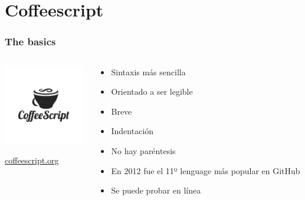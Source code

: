 %
%

\section{Coffeescript}

\begin{frame}
\frametitle{The basics}

\begin{columns}[T]
\begin{column}{.48\textwidth}
\begin{center}
\includegraphics[width=3.5cm]{figs/coffeescript}
\end{center}
\begin{flushright}
  {\Large
    \url{coffeescript.org}
  }
\end{flushright}

\end{column}%
\hfill%
\begin{column}{.50\textwidth}
{\Large
\begin{itemize}
  \item Sintaxis más sencilla
  \item Orientado a ser legible
  \item Breve
  \item Indentación
  \item No hay paréntesis
  \item En 2012 fue el 11º lenguage más popular en GitHub
  \item Se puede probar en línea
\end{itemize}
}
\end{column}%
\end{columns}

\end{frame}

